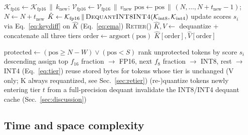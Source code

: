 \documentclass[conference]{IEEEtran}
\begin{document}
\begin{algorithm}[t]
\caption{\textsc{AdaptiveKVLayer.update}$(k_{\text{new}}, v_{\text{new}})$}
\label{alg:update}
\begin{algorithmic}[1]
\STATE $\mathcal{K}_{\text{fp16}} \gets \mathcal{K}_{\text{fp16}} \,\|\, k_{\text{new}}$;\quad
       $\mathcal{V}_{\text{fp16}} \gets \mathcal{V}_{\text{fp16}} \,\|\, v_{\text{new}}$
\STATE $\mathrm{pos} \gets \mathrm{pos} \,\|\, (N, \dots, N{+}t_{\text{new}}{-}1)$;\quad $N \gets N + t_{\text{new}}$
  \STATE $\hat{K} \gets \mathcal{K}_{\text{fp16}} \,\|\, \textsc{DequantINT8INT4}(\mathcal{K}_{\text{int8}}, \mathcal{K}_{\text{int4}})$ 
  \STATE update scores $s_i$ via Eq.~\ref{eq:keydiff} on $\hat{K}$ (Eq.~\ref{eq:ema})
\ENDIF
{}
  \STATE \textsc{Retier}() 
\ENDIF
\STATE $\hat{K}, \hat{V} \gets$ dequantize + concatenate all three tiers
\STATE $\mathrm{order} \gets \mathrm{argsort}(\mathrm{pos})$
\RETURN $\hat{K}[\mathrm{order}], \hat{V}[\mathrm{order}]$
\end{algorithmic}
\end{algorithm}

\begin{algorithm}[t]
\caption{\textsc{Retier}()}
\label{alg:retier}
\begin{algorithmic}[1]
\STATE $\mathrm{protected} \gets (\mathrm{pos} \geq N{-}W) \lor (\mathrm{pos} < S)$
\STATE rank unprotected tokens by score $s_i$ descending
\STATE assign top $f_{16}$ fraction $\to$ FP16, next $f_8$ fraction $\to$ INT8, rest $\to$ INT4 (Eq.~\ref{eq:tier})
  \STATE reuse stored bytes for tokens whose tier is unchanged (V only; K always requantized, see Sec.~\ref{sec:retier})
  \STATE (re-)quantize tokens newly entering tier $t$ from a full-precision dequant
\ENDFOR
\STATE invalidate the INT8/INT4 dequant cache (Sec.~\ref{sec:discussion})
\end{algorithmic}
\end{algorithm}

\subsection{Time and space complexity}
\label{sec:complexity}
\end{document}
